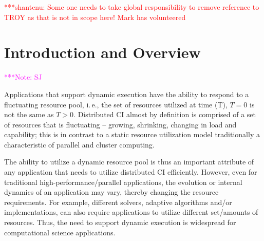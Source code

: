 \documentclass[conference,final]{IEEEtran}
\newcommand{\jhanote}[1]{ {\textcolor{red} { ***shantenu: #1 }}}
\newcommand{\alnote}[1]{ {\textcolor{blue} { ***andre: #1 }}}
\newcommand{\note}[1]{ {\textcolor{magenta} { ***Note: #1 }}}
\newcommand{\alnote}[1]{}
\newcommand{\jhanote}[1]{}
\newcommand{\note}[1]{}
\newcommand{\upp}{\vspace*{-0.5em}}
\begin{document}





\jhanote{Some one needs to take global responsibility to remove
  reference to TROY as that is not in scope here! Mark has
  volunteered}

\section{Introduction and Overview \upp\upp} \note{SJ}

Applications that support dynamic execution have the ability to
respond to a fluctuating resource pool, i.\,e., the set of resources
utilized at time (T), $T=0$ is not the same as $T>0$. Distributed CI
almost by definition is comprised of a set of resources that is
fluctuating -- growing, shrinking, changing in load and capability;
this is in contrast to a static resource utilization model
traditionally a characteristic of parallel and cluster computing.

The ability to utilize a dynamic resource pool is thus an important
attribute of any application that needs to utilize distributed CI
efficiently.  However, even for traditional high-performance/parallel
applications, the evolution or internal dynamics of an application may
vary, thereby changing the resource requirements.  For example,
different solvers, adaptive algorithms and/or implementations, can
also require applications to utilize different set/amounts of
resources.  Thus, the need to support dynamic execution is widespread
for computational science applications.
\end{document}
